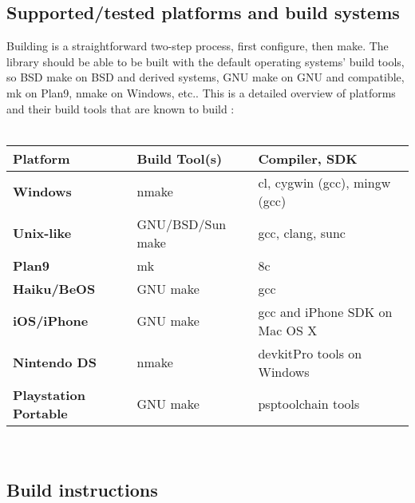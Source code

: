 \subsection{Supported/tested platforms and build systems}

Building  is a straightforward two-step process, first configure, then make. The
library should be able to be built with the default operating systems' build tools, so BSD make on
BSD and derived systems, GNU make on GNU and compatible, mk on Plan9, nmake on Windows, etc..
This is a detailed overview of platforms and their build tools that are known to build
:\\
\\


\begin{tabular}{l l l}
{\bf{\large Platform}}             & Build Tool(s)    & Compiler, SDK                              \\
\hline
{\bf{\large Windows}}              & nmake            & cl, cygwin (gcc), mingw (gcc)              \\
{\bf{\large Unix-like}}            & GNU/BSD/Sun make & gcc, clang, sunc                           \\
{\bf{\large Plan9}}                & mk               & 8c                                         \\
{\bf{\large Haiku/BeOS}}           & GNU make         & gcc                                        \\
{\bf{\large iOS/iPhone}}           & GNU make         & gcc and iPhone SDK on Mac OS X             \\
{\bf{\large Nintendo DS}}          & nmake            & devkitPro\cite{devkitPro} tools on Windows \\
{\bf{\large Playstation Portable}} & GNU make         & psptoolchain\cite{psptoolchain} tools      \\

\end{tabular}\\

\pagebreak

\subsection{Build instructions}


